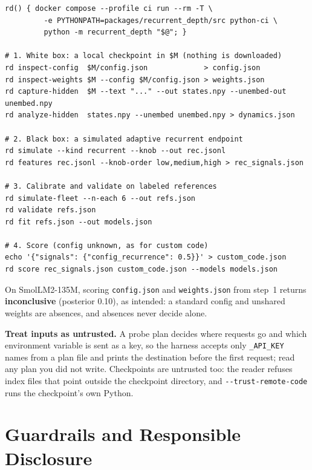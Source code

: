 \documentclass[11pt,letterpaper]{article}
\newcommand{\cfg}[1]{\texttt{\small #1}}
\begin{document}
\begin{codebox}
\begin{verbatim}
rd() { docker compose --profile ci run --rm -T \
         -e PYTHONPATH=packages/recurrent_depth/src python-ci \
         python -m recurrent_depth "$@"; }

# 1. White box: a local checkpoint in $M (nothing is downloaded)
rd inspect-config  $M/config.json             > config.json
rd inspect-weights $M --config $M/config.json > weights.json
rd capture-hidden  $M --text "..." --out states.npy --unembed-out unembed.npy
rd analyze-hidden  states.npy --unembed unembed.npy > dynamics.json

# 2. Black box: a simulated adaptive recurrent endpoint
rd simulate --kind recurrent --knob --out rec.jsonl
rd features rec.jsonl --knob-order low,medium,high > rec_signals.json

# 3. Calibrate and validate on labeled references
rd simulate-fleet --n-each 6 --out refs.json
rd validate refs.json
rd fit refs.json --out models.json

# 4. Score (config unknown, as for custom code)
echo '{"signals": {"config_recurrence": 0.5}}' > custom_code.json
rd score rec_signals.json custom_code.json --models models.json
\end{verbatim}
\end{codebox}

On SmolLM2-135M, scoring \cfg{config.json} and \cfg{weights.json} from step~1 returns \textbf{inconclusive} (posterior 0.10), as intended: a standard config and unshared weights are absences, and absences never decide alone.

\textbf{Treat inputs as untrusted.} A probe plan decides where requests go and which environment variable is sent as a key, so the harness accepts only \cfg{*\_API\_KEY} names from a plan file and prints the destination before the first request; read any plan you did not write. Checkpoints are untrusted too: the reader refuses index files that point outside the checkpoint directory, and \cfg{-{}-trust-remote-code} runs the checkpoint's own Python.

\section{Guardrails and Responsible Disclosure}
\label{sec:guardrails}
\end{document}
